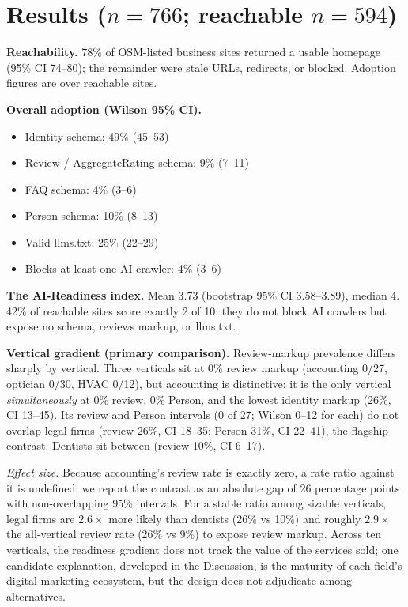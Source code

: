 \documentclass[11pt]{article}
\begin{document}
\section{Results ($n=766$; reachable $n=594$)}

\noindent\textbf{Reachability.} 78\% of OSM-listed business sites returned a usable homepage (95\% CI
74--80); the remainder were stale URLs, redirects, or blocked. Adoption figures are over reachable
sites.

\medskip
\noindent\textbf{Overall adoption (Wilson 95\% CI).}
\begin{itemize}
\item Identity schema: 49\% (45--53)
\item Review / AggregateRating schema: 9\% (7--11)
\item FAQ schema: 4\% (3--6)
\item Person schema: 10\% (8--13)
\item Valid llms.txt: 25\% (22--29)
\item Blocks at least one AI crawler: 4\% (3--6)
\end{itemize}

\noindent\textbf{The AI-Readiness index.} Mean 3.73 (bootstrap 95\% CI 3.58--3.89), median 4. 42\% of
reachable sites score exactly 2 of 10: they do not block AI crawlers but expose no schema, reviews
markup, or llms.txt.

\medskip
\noindent\textbf{Vertical gradient (primary comparison).} Review-markup prevalence differs sharply by
vertical. Three verticals sit at 0\% review markup (accounting 0/27, optician 0/30, HVAC 0/12), but
accounting is distinctive: it is the only vertical \emph{simultaneously} at 0\% review, 0\% Person,
and the lowest identity markup (26\%, CI 13--45). Its review and Person intervals (0 of 27; Wilson
0--12 for each) do not overlap legal firms (review 26\%, CI 18--35; Person 31\%, CI 22--41), the
flagship contrast. Dentists sit between (review 10\%, CI 6--17).

\medskip
\noindent\emph{Effect size.} Because accounting's review rate is exactly zero, a rate ratio against
it is undefined; we report the contrast as an absolute gap of 26 percentage points with
non-overlapping 95\% intervals. For a stable ratio among sizable verticals, legal firms are
$2.6\times$ more likely than dentists (26\% vs 10\%) and roughly $2.9\times$ the all-vertical review
rate (26\% vs 9\%) to expose review markup. Across ten verticals, the readiness gradient does not
track the value of the services sold; one candidate explanation, developed in the Discussion, is the
maturity of each field's digital-marketing ecosystem, but the design does not adjudicate among
alternatives.
\end{document}
